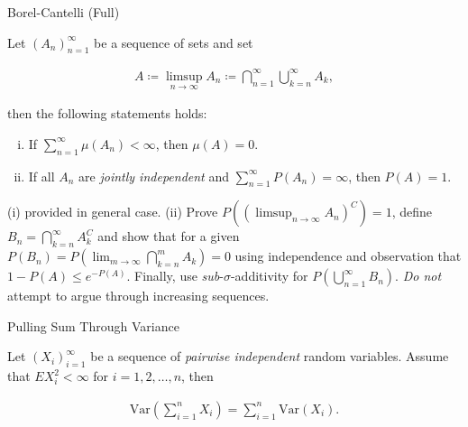 \begin{lemma}{6.9}{Borel-Cantelli (Full)}

    Let $(A_n)_{n=1}^{\infty}$ be a sequence of sets and set

        \begin{align*}
            A \coloneqq \limsup_{n \to \infty} A_n \coloneqq \bigcap_{n=1}^{\infty}\bigcup_{k=n}^{\infty} A_k,
        \end{align*}

    then the following statements holds:

        \begin{enumerate}[(i)]
            \setlength{\parskip}{0em}
            \item If $\sum_{n=1}^{\infty} \mu(A_n) < \infty$, then $\mu(A) = 0$.
            \item If all $A_n$ are \emph{jointly independent} and $\sum_{n=1}^{\infty} P(A_n) = \infty$, then $P(A) = 1$.
        \end{enumerate}

    \Hint (i) provided in general case. (ii) Prove $P((\limsup_{n \to \infty} A_n)^C) = 1$, define $B_n = \bigcap_{k=n}^{\infty} A_k^C$ and show that for a given $P(B_n) = P(\lim_{m \to \infty} \bigcap_{k=n}^{m} A_k) = 0$ using independence and observation that $1 - P(A) \leq e^{-P(A)}$. Finally, use \emph{sub}-$\sigma$-additivity for $P(\bigcup_{n=1}^{\infty} B_n)$. \emph{Do not} attempt to argue through increasing sequences.
    
\end{lemma}

\begin{exercise}{}{Pulling Sum Through Variance}

    Let $(X_i)_{i=1}^{\infty}$ be a sequence of \emph{pairwise independent} random variables. Assume that $EX_i^2 < \infty$ for $i=1,2,\hdots,n$, then

        \begin{align*}
            \mathrm{Var}\left(\sum_{i=1}^n X_i\right) = \sum_{i=1}^n \mathrm{Var}\left(X_i\right).
        \end{align*}

\end{exercise}
